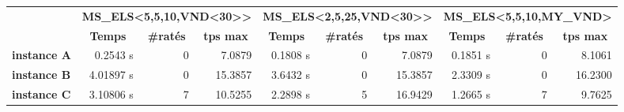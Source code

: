             \begin{table}[H]
                \centering
                \begin{tabular}{l|r|r|r|r|r|r|r|r|r|}
                \cline{2-10}
                                                                       & \multicolumn{3}{c|}{\textbf{MS\_ELS\textless5,5,10,VND\textless30\textgreater\textgreater}}                                           & \multicolumn{3}{c|}{\textbf{MS\_ELS\textless2,5,25,VND\textless30\textgreater\textgreater}}                                           & \multicolumn{3}{c|}{\textbf{MS\_ELS\textless5,5,10,MY\_VND\textgreater}}                                                              \\ \cline{2-10} 
                                                                       & \multicolumn{1}{c|}{\textbf{Temps}} & \multicolumn{1}{c|}{\textbf{\#ratés}} & \multicolumn{1}{c|}{\textbf{tps max}} & \multicolumn{1}{c|}{\textbf{Temps}} & \multicolumn{1}{c|}{\textbf{\#ratés}} & \multicolumn{1}{c|}{\textbf{tps max}} & \multicolumn{1}{c|}{\textbf{Temps}} & \multicolumn{1}{c|}{\textbf{\#ratés}} & \multicolumn{1}{c|}{\textbf{tps max}} \\ \hline
                \multicolumn{1}{|l|}{\textbf{instance A}} & 0.2543 s                            & 0                                             & 7.0879                                          & 0.1808 s                            & 0                                             & 7.0879                                          & 0.1851 s                            & 0                                             & 8.1061                                          \\ \hline
                \multicolumn{1}{|l|}{\textbf{instance B}} & 4.01897 s                           & 0                                             & 15.3857                                         & 3.6432 s                            & 0                                             & 15.3857                                         & 2.3309 s                            & 0                                             & 16.2300                                         \\ \hline
                \multicolumn{1}{|l|}{\textbf{instance C}} & 3.10806 s                           & 7                                             & 10.5255                                         & 2.2898 s                            & 5                                             & 16.9429                                         & 1.2665 s                            & 7                                             & 9.7625                                          \\ \hline

\end{tabular}
\end{table}
